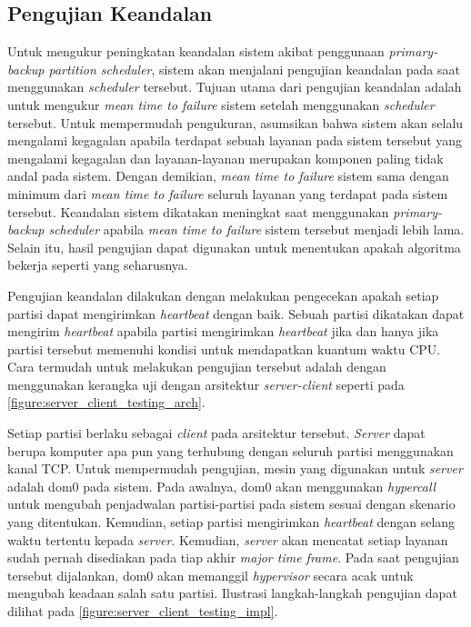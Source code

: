 \subsection{Pengujian Keandalan}
\label{section:pengujian_keandalan}
Untuk mengukur peningkatan keandalan sistem akibat penggunaan \textit{primary-backup partition
scheduler}, sistem akan menjalani pengujian keandalan pada saat menggunakan \textit{scheduler}
tersebut.  Tujuan utama dari pengujian keandalan adalah untuk mengukur \textit{mean time to
failure} sistem setelah menggunakan \textit{scheduler} tersebut. Untuk mempermudah pengukuran,
asumsikan bahwa sistem akan selalu mengalami kegagalan apabila terdapat sebuah layanan pada
sistem tersebut yang mengalami kegagalan dan layanan-layanan merupakan komponen paling tidak
andal pada sistem. Dengan demikian, \textit{mean time to failure} sistem sama dengan minimum
dari \textit{mean time to failure} seluruh layanan yang terdapat pada sistem tersebut. Keandalan
sistem dikatakan meningkat saat menggunakan \textit{primary-backup scheduler} apabila
\textit{mean time to failure} sistem tersebut menjadi lebih lama. Selain itu, hasil pengujian
dapat digunakan untuk menentukan apakah algoritma bekerja seperti yang seharusnya.

Pengujian keandalan dilakukan dengan melakukan pengecekan apakah setiap partisi dapat
mengirimkan \textit{heartbeat} dengan baik. Sebuah partisi dikatakan dapat mengirim
\textit{heartbeat} apabila partisi mengirimkan \textit{heartbeat} jika dan hanya jika partisi
tersebut memenuhi kondisi untuk mendapatkan kuantum waktu CPU. Cara termudah untuk melakukan
pengujian tersebut adalah dengan menggunakan kerangka uji dengan arsitektur
\textit{server-client} seperti pada \autoref{figure:server_client_testing_arch}.

Setiap partisi berlaku sebagai \textit{client} pada arsitektur tersebut. \textit{Server} dapat
berupa komputer apa pun yang terhubung dengan seluruh partisi menggunakan kanal TCP. Untuk
mempermudah pengujian, mesin yang digunakan untuk \textit{server} adalah dom0 pada sistem. Pada awalnya,
dom0 akan menggunakan \textit{hypercall} untuk mengubah penjadwalan partisi-partisi pada sistem
sesuai dengan skenario yang ditentukan.  Kemudian, setiap partisi mengirimkan \textit{heartbeat}
dengan selang waktu tertentu kepada \textit{server}.  Kemudian, \textit{server} akan mencatat
setiap layanan sudah pernah disediakan pada tiap akhir \textit{major time frame}. Pada saat
pengujian tersebut dijalankan, dom0 akan memanggil \textit{hypervisor} secara acak untuk
mengubah keadaan salah satu partisi. Ilustrasi langkah-langkah pengujian dapat dilihat pada
\autoref{figure:server_client_testing_impl}.

